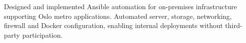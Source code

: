 Designed and implemented Ansible automation for on-premises infrastructure supporting Oslo metro applications. Automated server, storage, networking, firewall and Docker configuration, enabling internal deployments without third-party participation.
